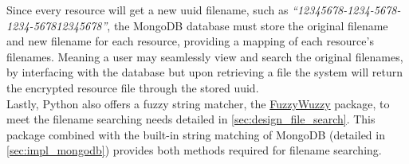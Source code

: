Since every resource will get a new \acrshort{uuid} filename, such as \textit{``12345678-1234-5678-1234-567812345678''}, the MongoDB database must store the original filename and new filename for each resource, providing a mapping of each resource's filenames. Meaning a user may seamlessly view and search the original filenames, by interfacing with the database but upon retrieving a file the system will return the encrypted resource file through the stored \acrshort{uuid}.\\
Lastly, Python also offers a fuzzy string matcher, the \href{https://pypi.org/project/fuzzywuzzy/}{FuzzyWuzzy} package, to meet the filename searching needs detailed in \cref{sec:design_file_search}. This package combined with the built-in string matching of MongoDB (detailed in \cref{sec:impl_mongodb}) provides both methods required for filename searching.
